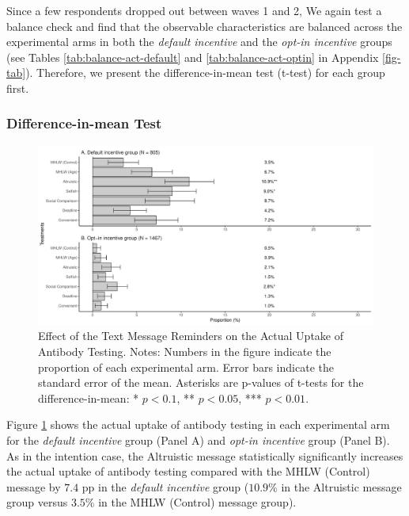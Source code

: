 \documentclass[
]{article}
\begin{document}
Since a few respondents dropped out between waves 1 and 2, We again test a balance check and find that the observable characteristics are balanced across the experimental arms in both the \emph{default incentive} and the \emph{opt-in incentive} groups (see Tables \ref{tab:balance-act-default} and \ref{tab:balance-act-optin} in Appendix \ref{fig-tab}). Therefore, we present the difference-in-mean test (t-test) for each group first.

\hypertarget{difference-in-mean-test-1}{%
\subsubsection{Difference-in-mean Test}\label{difference-in-mean-test-1}}

\begin{figure}[t]
\includegraphics{discussion-paper_files/figure-latex/ttest-act-test-1} \caption{Effect of the Text Message Reminders on the Actual Uptake of Antibody Testing. Notes: Numbers in the figure indicate the proportion of each experimental arm. Error bars indicate the standard error of the mean. Asterisks are p-values of t-tests for the difference-in-mean: * $p < 0.1$, ** $p < 0.05$, *** $p < 0.01$.}\label{fig:ttest-act-test}
\end{figure}

Figure \ref{fig:ttest-act-test} shows the actual uptake of antibody testing in each experimental arm for the \emph{default incentive} group (Panel A) and \emph{opt-in incentive} group (Panel B). As in the intention case, the Altruistic message statistically significantly increases the actual uptake of antibody testing compared with the MHLW (Control) message by \(7.4\) pp in the \emph{default incentive} group (\(10.9\)\% in the Altruistic message group versus \(3.5\)\% in the MHLW (Control) message group).
\end{document}
